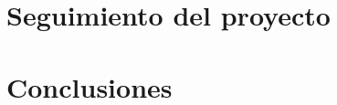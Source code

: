 \documentclass[openright,twoside,10pt]{book}
\begin{document}
\chapter{Seguimiento del proyecto}\label{cap:seguimiento}


\chapter{Conclusiones}\label{cap.conclusiones}







\cleardoublepage
{}

 


\end{document}
